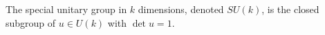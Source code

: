 The special unitary group in $k$ dimensions, denoted $SU(k)$, is the closed subgroup of $u \in U(k)$ with $\det u = 1$.
